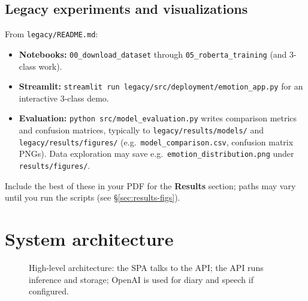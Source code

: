 \documentclass[11pt,a4paper]{article}
\begin{document}
\subsection{Legacy experiments and visualizations}
From \texttt{legacy/README.md}:
\begin{itemize}[itemsep=0.28em]
  \item \textbf{Notebooks:} \texttt{00\_download\_dataset} through \texttt{05\_roberta\_training} (and 3-class work).
  \item \textbf{Streamlit:} \texttt{streamlit run legacy/src/deployment/emotion\_app.py} for an interactive 3-class demo.
  \item \textbf{Evaluation:} \texttt{python src/model\_evaluation.py} writes comparison metrics and confusion matrices, typically to \texttt{legacy/results/models/} and \texttt{legacy/results/figures/} (e.g.\ \texttt{model\_comparison.csv}, confusion matrix PNGs). Data exploration may save e.g.\ \texttt{emotion\_distribution.png} under \texttt{results/figures/}.
\end{itemize}
\noindent
Include the best of these in your PDF for the \textbf{Results} section; paths may vary until you run the scripts (see \S\ref{sec:results-figs}).

\section{System architecture}
\label{sec:arch}

\begin{figure}[H]
\centering
{}
\caption{High-level architecture: the SPA talks to the API; the API runs inference and storage; OpenAI is used for diary and speech if configured.}
\label{fig:arch}
\end{figure}
\end{document}
